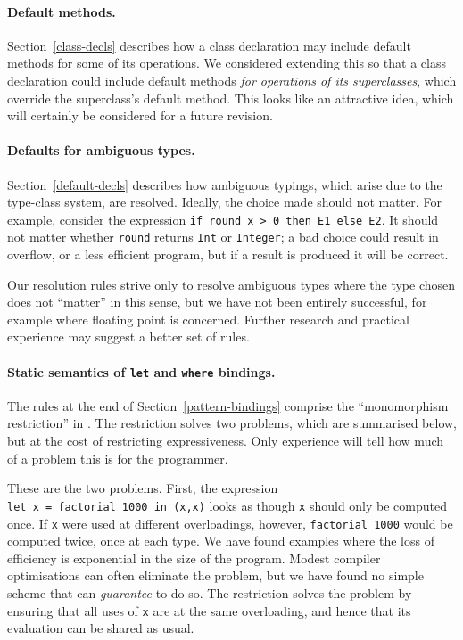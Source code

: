 \paragraph*{Default methods.}
Section~\ref{class-decls} describes how a class declaration may
include default methods for some of its operations.  We considered extending
this so that a class declaration could include default methods {\em for
operations of its superclasses}, which override the superclass's default
method.  This looks like an attractive idea, which will certainly
be considered for a future revision.

\paragraph*{Defaults for ambiguous types.}
Section~\ref{default-decls}
describes how ambiguous typings, which arise due to the type-class system,
are resolved.  Ideally, the choice made should not matter. For example,
consider the expression \mbox{\tt if\ round\ x\ >\ 0\ then\ E1\ else\ E2}.  It should
not matter whether \mbox{\tt round} returns \mbox{\tt Int} or \mbox{\tt Integer};
a bad choice could result in overflow, or a less efficient
program, but if a result is produced it will be correct.  

Our resolution rules strive only to resolve ambiguous
types where the type chosen does not ``matter'' in this sense, but we have
not been entirely successful, for example where floating point is concerned.
Further research and practical experience may suggest a better set of rules.

\paragraph*{Static semantics of \mbox{\tt let} and \mbox{\tt where} bindings.}
\label{next-stage-monomorphic}

The rules at the end of Section~\ref{pattern-bindings} comprise the
``monomorphism restriction''
in \Haskell{}.  The
restriction solves two problems, which are summarised below, but at
the cost of restricting expressiveness.  Only experience will tell how
much of a problem this is for the programmer.

These are the two problems.  First, the expression
\mbox{\tt let\ x\ =\ factorial\ 1000\ in\ (x,x)} looks as though 
\mbox{\tt x} should only be computed once.  If \mbox{\tt x} were used
at different overloadings, however, \mbox{\tt factorial\ 1000} would be computed 
twice, once at each type.  We have found examples where the loss of efficiency
is exponential in the size of the program.  
Modest compiler optimisations can often eliminate
the problem, but we have found no simple scheme that can {\em guarantee} to do so.
The restriction solves the problem by ensuring that all uses of \mbox{\tt x} are
at the same overloading, and hence that its evaluation can be shared as usual.

